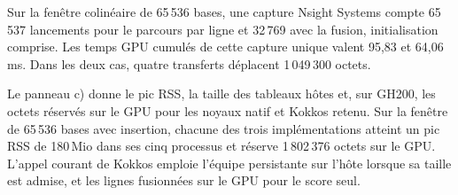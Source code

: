 Sur la fenêtre colinéaire de 65\,536 bases, une capture Nsight Systems compte 65\,537 lancements pour le parcours par ligne et 32\,769 avec la fusion, initialisation comprise. Les temps GPU cumulés de cette capture unique valent 95,83 et 64,06\,ms. Dans les deux cas, quatre transferts déplacent 1\,049\,300 octets.

Le panneau c) donne le pic RSS, la taille des tableaux hôtes et, sur GH200, les octets réservés sur le GPU pour les noyaux natif et Kokkos retenu. Sur la fenêtre de 65\,536 bases avec insertion, chacune des trois implémentations atteint un pic RSS de 180\,Mio dans ses cinq processus et réserve 1\,802\,376 octets sur le GPU. L'appel courant de Kokkos emploie l'équipe persistante sur l'hôte lorsque sa taille est admise, et les lignes fusionnées sur le GPU pour le score seul.

\FloatBarrier
{}
